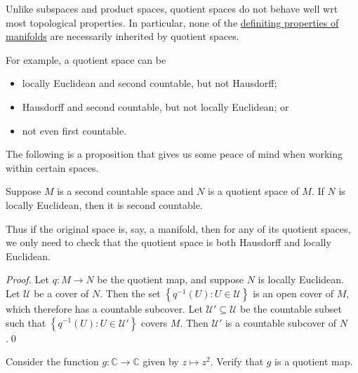 \documentclass[notoc,notitlepage]{tufte-book}
\begin{document}
\begin{warning}
  Unlike subspaces and product spaces, quotient spaces do not behave well wrt most topological
  properties. In particular, none of the \hyperref[defn:manifold]{definiting properties of
  manifolds} are necessarily inherited by quotient spaces.

  For example, a quotient space can be
  \begin{itemize}
    \item locally Euclidean and second countable, but not Hausdorff;
    \item Hausdorff and second countable, but not locally Euclidean; or
    \item not even first countable.
  \end{itemize}
\end{warning}

The following is a proposition that gives us some peace of mind when working within certain
spaces.

\begin{propo}\label{propo:locally_euclidean_quotient_space_of_a_second_countable_space_is_second_countable}
  Suppose $M$ is a second countable space and $N$ is a quotient space of $M$. If $N$ is
  locally Euclidean, then it is second countable.
\end{propo}

\begin{note}
  Thus if the original space is, say, a manifold, then for any of its quotient spaces, we only
  need to check that the quotient space is both Hausdorff and locally Euclidean.
\end{note}

\begin{proof}
  Let $q : M \to N$ be the quotient map, and suppose $N$ is locally Euclidean. Let $\mathcal{U}$
  be a cover of $N$. Then the set $\left\{ q^{-1}(U) : U \in \mathcal{U} \right\}$ is an open
  cover of $M$, which therefore has a countable subcover. Let $\mathcal{U}' \subseteq \mathcal{U}$
  be the countable subset such that $\left\{ q^{-1}(U) : U \in \mathcal{U}' \right\}$ covers $M$.
  Then $\mathcal{U}'$ is a countable subcover of $N$.\qed\
\end{proof}

\begin{ex}
  Consider the function $g : \mathbb{C} \to \mathbb{C}$ given by $z \mapsto z^2$. Verify that
  $g$ is a quotient map.
\end{ex}
\end{document}
